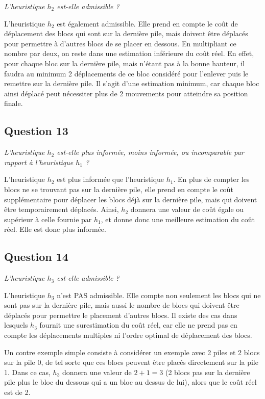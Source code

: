 \textit{L'heuristique $h_2$ est-elle admissible ?}

L'heuristique $h_2$ est également admissible. Elle prend en compte le coût de déplacement des blocs qui sont sur la dernière pile, mais doivent être déplacés pour permettre à d'autres blocs de se placer en dessous. En multipliant ce nombre par deux, on reste dans une estimation inférieure du coût réel. En effet, pour chaque bloc sur la dernière pile, mais n'étant pas à la bonne hauteur, il faudra au minimum 2 déplacements de ce bloc considéré pour l'enlever puis le remettre sur la dernière pile. Il s'agit d'une estimation minimum, car chaque bloc ainsi déplacé peut nécessiter plus de 2 mouvements pour atteindre sa position finale.

\subsection{Question 13}

\textit{L'heuristique $h_2$ est-elle plus informée, moins informée, ou incomparable par rapport à l'heuristique $h_1$ ?}

L'heuristique $h_2$ est plus informée que l'heuristique $h_1$. En plus de compter les blocs ne se trouvant pas sur la dernière pile, elle prend en compte le coût supplémentaire pour déplacer les blocs déjà sur la dernière pile, mais qui doivent être temporairement déplacés. Ainsi, $h_2$ donnera une valeur de coût égale ou supérieur à celle fournie par $h_1$, et donne donc une meilleure estimation du coût réel. Elle est donc plus informée.

\subsection{Question 14}

\textit{L'heuristique $h_3$ est-elle admissible ?}

L'heuristique $h_3$ n'est PAS admissible. Elle compte non seulement les blocs qui ne sont pas sur la dernière pile, mais aussi le nombre de blocs qui doivent être déplacés pour permettre le placement d'autres blocs. Il existe des cas dans lesquels $h_3$ fournit une surestimation du coût réel, car elle ne prend pas en compte les déplacements multiples ni l'ordre optimal de déplacement des blocs.

Un contre exemple simple consiste à considérer un exemple avec 2 piles et 2 blocs sur la pile 0, de tel sorte que ces blocs peuvent être placés directement sur la pile 1. Dans ce cas, $h_3$ donnera une valeur de $2 + 1 = 3$ (2 blocs pas sur la dernière pile plus le bloc du dessous qui a un bloc au dessus de lui), alors que le coût réel est de 2. 

